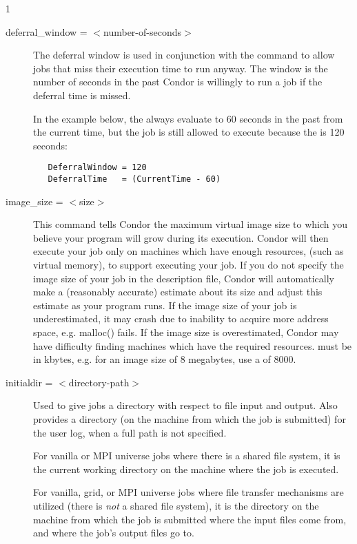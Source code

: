 \begin{ManPage}{\label{man-condor-submit}}{1}
\begin{description}
\item[deferral\_window = $<$number-of-seconds$>$]
The deferral window is used in conjunction with the
 command to allow jobs that
miss their execution time to run anyway. The window is
the number of seconds in the past Condor is willingly
to run a job if the deferral time is missed.

In the example below, the  always
evaluate to 60 seconds in the past from the current time, but
the job is still allowed to execute because the 
 is 120 seconds:

\begin{verbatim} 
   DeferralWindow = 120
   DeferralTime   = (CurrentTime - 60)
\end{verbatim}



\item[image\_size = $<$size$>$] This command tells Condor the maximum
virtual image size to which you believe your program will grow during
its execution. Condor will then execute your job only on machines which
have enough resources, (such as virtual memory), to support executing
your job. If you do not specify the image size of your job in the
description file, Condor will automatically make a (reasonably accurate)
estimate about its size and adjust this estimate as your program runs.
If the image size of your job is underestimated, it may crash due to
inability to acquire more address space, e.g. malloc() fails. If the image
size is overestimated, Condor may have difficulty finding machines which
have the required resources.  must be in kbytes, e.g. for
an image size of 8 megabytes, use a  of 8000.


\item[initialdir = $<$directory-path$>$] 
Used to give jobs a directory with respect to file input and output.
Also provides a directory 
(on the machine from which the job is submitted)
for the user log, when a full path is not specified. 

For vanilla or MPI universe jobs where there is a shared file system,
it is the current working directory on the machine where the
job is executed.

For vanilla, grid, or MPI universe jobs where file transfer mechanisms are
utilized (there is \emph{not} a shared file system),
it is the directory on the machine from which the job is submitted
where the input files come from, and where the job's output
files go to.


\end{description}
\end{ManPage}
